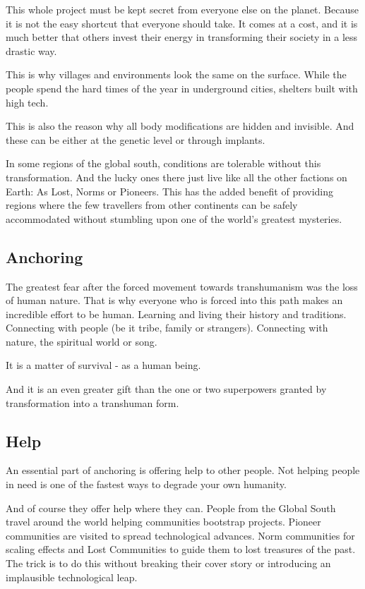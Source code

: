 This whole project must be kept secret from everyone else on the planet. Because it is not the easy shortcut that everyone should take. It comes at a cost, and it is much better that others invest their energy in transforming their society in a less drastic way.

This is why villages and environments look the same on the surface. While the people spend the hard times of the year in underground cities, shelters built with high tech.

This is also the reason why all body modifications are hidden and invisible. And these can be either at the genetic level or through implants.

In some regions of the global south, conditions are tolerable without this transformation. And the lucky ones there just live like all the other factions on Earth: As Lost, Norms or Pioneers. This has the added benefit of providing regions where the few travellers from other continents can be safely accommodated without stumbling upon one of the world's greatest mysteries.

\subsection{Anchoring}

The greatest fear after the forced movement towards transhumanism was the loss of human nature.
That is why everyone who is forced into this path makes an incredible effort to be human. Learning and living their history and traditions. Connecting with people (be it tribe, family or strangers). Connecting with nature, the spiritual world or song.

It is a matter of survival - as a human being.

And it is an even greater gift than the one or two superpowers granted by transformation into a transhuman form.

\subsection{Help}

An essential part of anchoring is offering help to other people. Not helping people in need is one of the fastest ways to degrade your own humanity.

And of course they offer help where they can. People from the Global South travel around the world helping communities bootstrap projects. Pioneer communities are visited to spread technological advances. Norm communities for scaling effects and Lost Communities to guide them to lost treasures of the past. The trick is to do this without breaking their cover story or introducing an implausible technological leap.

